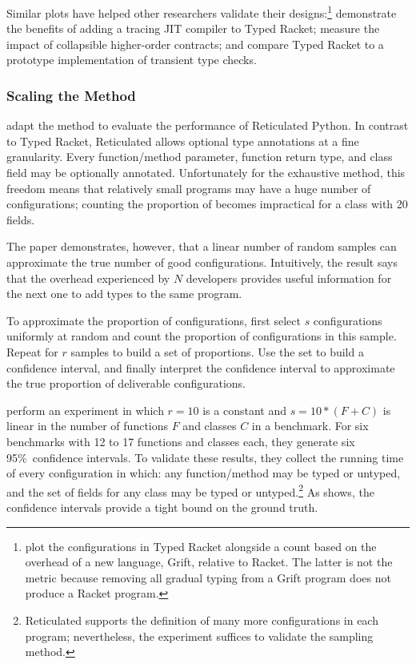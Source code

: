 Similar plots have helped other researchers validate their designs:\footnote{\citet{kas-pldi-2019} plot the
  configurations in Typed Racket alongside a count based on
 the overhead of a new language, Grift, relative to Racket.
 The latter is not the  metric because removing all gradual typing from
 a Grift program does not produce a Racket program.}
\citet{bbst-oopsla-2017} demonstrate the benefits of adding a tracing JIT compiler to Typed Racket;
\citet{fgsfs-oopsla-2018} measure the impact of collapsible higher-order contracts; and
\citet{gf-icfp-2018} compare Typed Racket to a prototype implementation of transient type checks.


\subsubsection{Scaling the Method}

\citet{gm-pepm-2018} adapt the method to evaluate the performance of Reticulated
 Python.
In contrast to Typed Racket, Reticulated allows optional type annotations at
 a fine granularity.
Every function/method parameter, function return type, and class field may
 be optionally annotated.
Unfortunately for the exhaustive method, this freedom means that relatively
 small programs may have a huge number of configurations;
 counting the proportion of  becomes impractical for a class with 20 fields.

The paper demonstrates, however, that a linear number of random samples can
 approximate the true number of good configurations.
Intuitively, the result says that the overhead experienced by $N$ developers
 provides useful information for the next one to add types to the same program.

To approximate the proportion of  configurations,
 first select $s$ configurations uniformly at random and count the
 proportion of  configurations in this sample.
Repeat for $r$ samples to build a set of proportions.
Use the set to build a confidence interval, and finally interpret the
 confidence interval to approximate the true proportion of deliverable configurations.

\citet{gm-pepm-2018} perform an experiment in which $r=10$ is a constant
 and $s = 10 * (F + C)$ is linear in the number of functions $F$ and classes
 $C$ in a benchmark.
For six benchmarks with 12 to 17 functions and classes each,
 they generate six 95\%~confidence intervals.
To validate these results, they collect the running time of every configuration
 in which: any function/method may be typed or untyped, and the set of fields
 for any class may be typed or untyped.\footnote{Reticulated supports the definition
  of many more configurations in each program; nevertheless, the experiment suffices to
  validate the sampling method.}
As  shows, the confidence intervals provide a tight
 bound on the ground truth.


